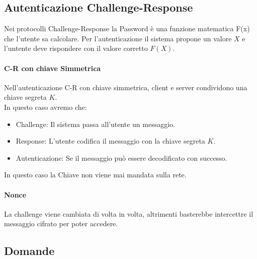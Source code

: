 \documentclass[12pt, a4paper, openany]{book}
\begin{document}
\subsection*{Autenticazione Challenge-Response}
Nei protocolli Challenge-Response la Password è una funzione matematica F(x) che l'utente sa calcolare. Per l'autenticazione il sistema propone un valore $X$ e l'untente deve rispondere con il valore corretto $F(X)$.

\paragraph{C-R con chiave Simmetrica}
Nell'autenticazione C-R con chiave simmetrica, client e server condividono una chiave segreta $K$.
\\In questo caso avremo che:
\begin{itemize}
    \item Challenge: Il sistema passa all'utente un messaggio.
    \item Response: L'utente codifica il messaggio con la chiave segreta $K$.
    \item Autenticazione: Se il messaggio può essere decodificato con successo.
\end{itemize}
In questo caso la Chiave non viene mai mandata sulla rete.

\paragraph{Nonce} La challenge viene cambiata di volta in volta, altrimenti basterebbe intercettre il messaggio cifrato per poter accedere.


\subsection{Domande}


\end{document}
